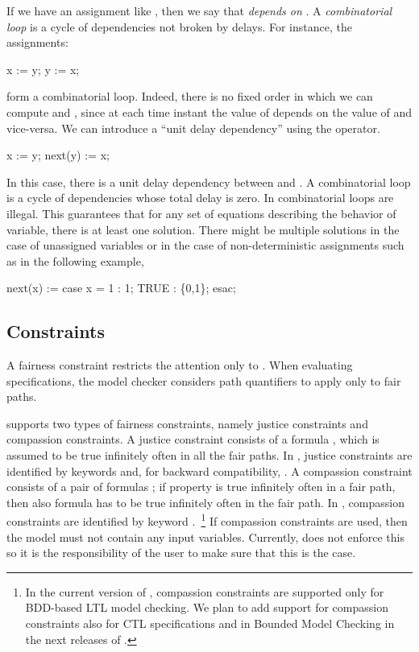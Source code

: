 If we have an assignment like  \reserved{:=} 
\reserved{;}, then we say that  \emph{depends on} . A
\emph{combinatorial loop} is a cycle of dependencies not broken by
delays. For instance, the assignments:
%
\begin{nusmvCode}
x := y;
y := x;
\end{nusmvCode}
%
form a combinatorial loop. Indeed, there is no fixed order in which we
can compute  and , since at each time instant the
value of  depends on the value of  and vice-versa. We
can introduce a ``unit delay dependency'' using the 
operator.
%
\begin{nusmvCode}
      x := y;
next(y) := x;
\end{nusmvCode}
%
In this case, there is a unit delay dependency between  and
. 
%
A combinatorial loop is a cycle of dependencies whose total delay is
zero. In \nusmv combinatorial loops are illegal. This guarantees that
for any set of equations describing the behavior of variable, there is
at least one solution. There might be multiple solutions in the case
of unassigned variables or in the case of non-deterministic
assignments such as in the following example,
%
\begin{nusmvCode}
    next(x) := case x = 1 : 1;
                    TRUE  : \{0,1\};
               esac;
\end{nusmvCode}



\subsection{ Constraints}
\label{FAIRNESS Constraints}
%
A fairness constraint restricts the attention only to . When evaluating specifications, the model checker
considers path quantifiers to apply only to fair paths.

\nusmv supports two types of fairness constraints, namely justice
constraints and compassion constraints. 
%
A justice constraint consists of a formula , which is assumed
to be true infinitely often in all the fair paths.
%
In \nusmv, justice constraints are identified by
keywords  and, for backward compatibility,
.
%
A compassion constraint consists of a pair of formulas ;
if property  is true infinitely often in a fair path, then
also formula  has to be true infinitely often in the fair
path.
%
In \nusmv, compassion constraints are identified by keyword
.~\footnote{In the current version of \nusmv,
compassion constraints are supported only for BDD-based LTL model
checking. We plan to add support for compassion constraints also for
CTL specifications and in Bounded Model Checking in the next releases
of \nusmv.} 
%
If compassion constraints are used, then the model must not contain any
input variables. 
%
Currently, \nusmv does not enforce this so it is the responsibility of
the user to make sure that this is the case.

